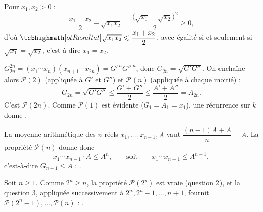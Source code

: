 
\enParties

\begin{corrigeEval}{}{}
\begin{questions}
  \item Pour $x_1,x_2>0$ :
    \[\frac{x_1+x_2}{2}-\sqrt{x_1x_2}=\frac{\bigl(\sqrt{x_1}-\sqrt{x_2}\bigr)^{2}}{2}\geqslant0,\]
    d'où $\res{\sqrt{x_1x_2}\leqslant\dfrac{x_1+x_2}{2}}$, avec égalité si et
    seulement si $\sqrt{x_1}=\sqrt{x_2}$, c'est-à-dire $x_1=x_2$.
  \item $G_{2n}^{2n}=(x_1\cdots x_n)(x_{n+1}\cdots x_{2n})=G'^{\,n}G''^{\,n}$,
    donc $G_{2n}=\sqrt{G'G''}$. On enchaîne alors $\mathcal{P}(2)$ (appliquée
    à $G'$ et $G''$) et $\mathcal{P}(n)$ (appliquée à chaque moitié) :
    \[G_{2n}=\sqrt{G'G''}\leqslant\frac{G'+G''}{2}\leqslant\frac{A'+A''}{2}=A_{2n}.\]
    C'est $\mathcal{P}(2n)$. Comme $\mathcal{P}(1)$ est évidente
    ($G_1=A_1=x_1$), une récurrence sur $k$ donne
    .
  \item La moyenne arithmétique des $n$ réels $x_1,\dots,x_{n-1},A$ vaut
    $\dfrac{(n-1)A+A}{n}=A$. La propriété $\mathcal{P}(n)$ donne donc
    \[x_1\cdots x_{n-1}\cdot A\leqslant A^{n},\qquad\text{soit}\qquad
      x_1\cdots x_{n-1}\leqslant A^{n-1},\]
    c'est-à-dire $G_{n-1}\leqslant A$ : .
  \item Soit $n\geqslant1$. Comme $2^{n}\geqslant n$, la propriété
    $\mathcal{P}(2^{n})$ est vraie (question 2), et la question 3,
    appliquée successivement à $2^{n},2^{n}-1,\dots,n+1$, fournit
    $\mathcal{P}(2^{n}-1),\dots,\mathcal{P}(n)$ : .
\end{questions}
\end{corrigeEval}

